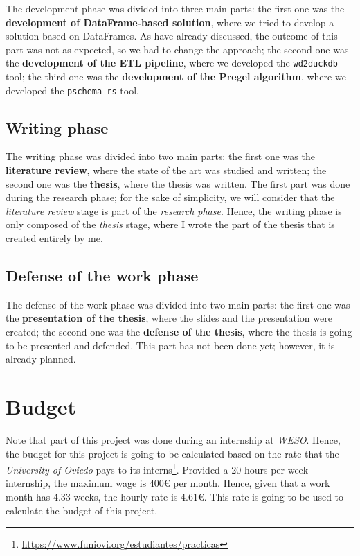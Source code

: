 The development phase was divided into three main parts: the first one was the \textbf{development of DataFrame-based solution}, where we tried to develop a solution based on DataFrames. As have already discussed, the outcome of this part was not as expected, so we had to change the approach; the second one was the \textbf{development of the ETL pipeline}, where we developed the \texttt{wd2duckdb} tool; the third one was the \textbf{development of the Pregel algorithm}, where we developed the \texttt{pschema-rs} tool.

\subsection{Writing phase}

The writing phase was divided into two main parts: the first one was the \textbf{literature review}, where the state of the art was studied and written; the second one was the \textbf{thesis}, where the thesis was written. The first part was done during the research phase; for the sake of simplicity, we will consider that the \textit{literature review} stage is part of the \textit{research phase}. Hence, the writing phase is only composed of the \textit{thesis} stage, where I wrote the part of the thesis that is created entirely by me.

\subsection{Defense of the work phase}

The defense of the work phase was divided into two main parts: the first one was the \textbf{presentation of the thesis}, where the slides and the presentation were created; the second one was the \textbf{defense of the thesis}, where the thesis is going to be presented and defended. This part has not been done yet; however, it is already planned.

\section{Budget}

Note that part of this project was done during an internship at \textit{WESO}. Hence, the budget for this project is going to be calculated based on the rate that the \textit{University of Oviedo} pays to its interns\footnote{\url{https://www.funiovi.org/estudiantes/practicas}}. Provided a 20 hours per week internship, the maximum wage is 400€ per month. Hence, given that a work month has 4.33 weeks, the hourly rate is 4.61€. This rate is going to be used to calculate the budget of this project.

